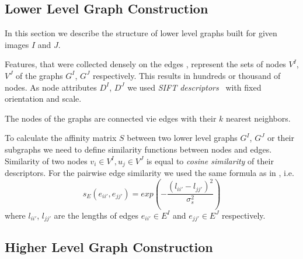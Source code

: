\documentclass[
	fontsize=12pt,
	paper=a4,
	twoside=false,
	numbers=noenddot,
	plainheadsepline,
	toc=listof,
	toc=bibliography
]{scrartcl}
\begin{document}
\FloatBarrier

\subsection{Lower Level Graph Construction}

In this section we describe the structure of lower level graphs built for given images $I$ and $J$.

Features, that were collected densely on the edges \cite{PMT}, represent the sets of nodes $V^I$, $V^J$ of the graphs $G^I$, $G^J$ respectively. This results in hundreds or thousand of nodes. As node attributes $D^I$, $D^J$ we used \emph{SIFT descriptors}~\cite{Lowe2004} with fixed orientation and scale. 

The nodes of the graphs are connected vie edges with their $k$ nearest neighbors.

To calculate the affinity matrix $S$ between two lower level graphs  $G^I$, $G^J$ or their subgraphs we need to define similarity functions between nodes and edges. Similarity of two nodes $v_i\in V^I, u_j\in V^J$ is equal to \emph{cosine similarity} of their descriptors.
For the pairwise edge similarity we used the same formula as in \cite{Cho2014_Haystack, Suh_CVPR2015}, i.e.\ 
\begin{equation}
s_E(e_{ii\prime}, e_{jj\prime}) = exp(-\frac{(l_{ii\prime} - l_{jj\prime})^2}{\sigma^2_{s}})
\label{eq:s_e}
\end{equation}
where $l_{ii\prime}$, $l_{jj\prime} $ are the lengths of edges $e_{ii\prime}\in E^I$ and $e_{jj\prime}\in E^J$ respectively.




\subsection{Higher Level Graph Construction}

\end{document}
